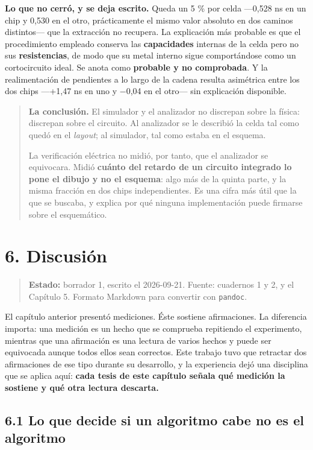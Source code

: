 \textbf{Lo que no cerró, y se deja escrito.} Queda un 5 \% por celda
---0,528 ns en un chip y 0,530 en el otro, prácticamente el mismo valor
absoluto en dos caminos distintos--- que la extracción no recupera. La
explicación más probable es que el procedimiento empleado conserva las
\textbf{capacidades} internas de la celda pero no sus
\textbf{resistencias}, de modo que su metal interno sigue comportándose
como un cortocircuito ideal. Se anota como \textbf{probable y no
comprobada}. Y la realimentación de pendientes a lo largo de la cadena
resulta asimétrica entre los dos chips ---+1,47 ns en uno y −0,04 en el
otro--- sin explicación disponible.

\begin{quote}
\textbf{La conclusión.} El simulador y el analizador no discrepan sobre
la física: discrepan sobre el circuito. Al analizador se le describió la
celda tal como quedó en el \emph{layout}; al simulador, tal como estaba
en el esquema.

La verificación eléctrica no midió, por tanto, que el analizador se
equivocara. Midió \textbf{cuánto del retardo de un circuito integrado lo
pone el dibujo y no el esquema}: algo más de la quinta parte, y la misma
fracción en dos chips independientes. Es una cifra más útil que la que
se buscaba, y explica por qué ninguna implementación puede firmarse
sobre el esquemático.
\end{quote}

\chapter{6. Discusión}\label{discusiuxf3n}

\begin{quote}
\textbf{Estado:} borrador 1, escrito el 2026-09-21. Fuente: cuadernos 1
y 2, y el Capítulo 5. Formato Markdown para convertir con
\texttt{pandoc}.
\end{quote}

El capítulo anterior presentó mediciones. Éste sostiene afirmaciones. La
diferencia importa: una medición es un hecho que se comprueba repitiendo
el experimento, mientras que una afirmación es una lectura de varios
hechos y puede ser equivocada aunque todos ellos sean correctos. Este
trabajo tuvo que retractar dos afirmaciones de ese tipo durante su
desarrollo, y la experiencia dejó una disciplina que se aplica aquí:
\textbf{cada tesis de este capítulo señala qué medición la sostiene y
qué otra lectura descarta.}

\section{6.1 Lo que decide si un algoritmo cabe no es el
algoritmo}\label{lo-que-decide-si-un-algoritmo-cabe-no-es-el-algoritmo}


